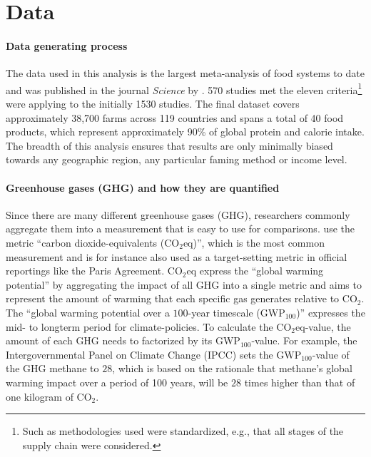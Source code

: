 \documentclass{article}
\begin{document}
\section{Data}
\label{data}
\paragraph{Data generating process} \label{dataGen}
The data used in this analysis  is the largest meta-analysis of food systems to date and was published in the journal \textit{Science} by \citet{Poore2018}.
570 studies met the eleven criteria\footnote{Such as  methodologies used were standardized, e.g., that all stages of the supply chain were considered.} \citet{Poore2018}  were applying to the initially  1530 studies.
The final dataset covers approximately 38,700 farms across 119 countries and spans a total of 40 food products, which represent approximately 90\% of global protein and calorie intake. The breadth of this analysis ensures that results are only minimally biased towards any geographic region,  any particular faming method or income level.
\paragraph*{Greenhouse gases (GHG) and how they are quantified}
Since there are many different greenhouse gases (GHG), researchers commonly aggregate them into a measurement that is easy to use for comparisons. 
\citet{Poore2018} use the metric 
``carbon dioxide-equivalents (CO$_{2}$eq)'', which is the most common measurement and is for instance  also used as a target-setting metric in official reportings like the Paris Agreement. CO$_{2}$eq express the ``global warming potential'' by aggregating the impact of all GHG into a single metric  and  aims to represent the amount of warming that each specific gas generates relative to CO$_2$. The ``global warming potential over a $100$-year timescale (GWP$_{100}$)'' expresses the mid- to longterm period for climate-policies. To calculate the CO$_{2}$eq-value, the amount of each GHG needs to factorized by its GWP$_{100}$-value. For example, the Intergovernmental Panel on Climate Change (IPCC) sets the GWP$_{100}$-value of the GHG  methane to $28$, which is based on the rationale that methane's global warming impact over a period of 100 years, will be $28$ times higher than that of one kilogram of CO$_2$.
\end{document}
